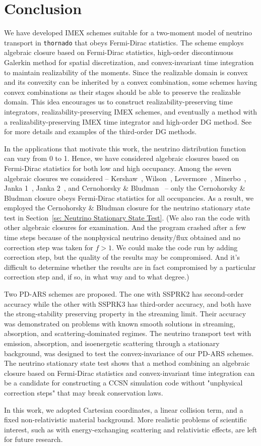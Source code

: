 \section{Conclusion}\label{se:Conclusion}

We have developed IMEX schemes suitable for a two-moment model of neutrino transport in \texttt{thornado} that obeys Fermi-Dirac statistics.
The scheme employs algebraic closure based on Fermi-Dirac statistics, high-order discontinuous Galerkin method for spatial discretization, and convex-invariant time integration to maintain realizability of the moments.  
Since the realizable domain is convex and its convexity can be inherited by a convex combination, some schemes having convex combinations as their stages should be able to preserve the realizable domain.
This idea encourages us to construct realizability-preserving time integrators, realizability-preserving IMEX schemes, and eventually a method with a realizability-preserving IMEX time integrator and high-order DG method.
See~\cite{chu_etal_2018} for more details and examples of the third-order DG methods.  

In the applications that motivate this work, the neutrino distribution function can vary from 0 to 1.  
Hence, we have considered algebraic closures based on Fermi-Dirac statistics for both low and high occupancy.  
Among the seven algebraic closures we considered -- Kershaw~\cite{kershaw_1976}, Wilson~\cite{wilson_1975,leblancWilson_1970}, Levermore~\cite{levermore_1984}, Minerbo~\cite{minerbo_1978}, Janka 1~\cite{janka_1991}, Janka 2~\cite{janka_1992}, and Cernohorsky \& Bludman~\cite{cernohorskyBludman_1994} -- only the Cernohorsky \& Bludman closure obeys Fermi-Dirac statistics for all occupancies.  
As a result, we employed the Cernohorsky \& Bludman closure for the neutrino stationary state test in Section~\ref{se: Neutrino Stationary State Test}.
(We also ran the code with other algebraic closures for examination.
And the program crashed after a few time steps because of the nonphysical neutrino density/flux obtained and no correction step was taken for $f>1$.
We could make the code run by adding correction step, but the quality of the results may be compromised.
And it's difficult to determine whether the results are in fact compromised by a particular correction step and, if so, in what way and to what degree.)

Two PD-ARS schemes are proposed.
The one with SSPRK2 has second-order accuracy while the other with SSPRK3 has third-order accuracy, and both have the strong-stability preserving property in the streaming limit.  
Their accuracy was demonstrated on problems with known smooth solutions in streaming, absorption, and scattering-dominated regimes.
The neutrino transport test with emission, absorption, and isoenergetic scattering through a stationary background, was designed to test the convex-invariance of our PD-ARS schemes. 
The neutrino stationary state test shows that a method combining an algebraic closure based on Fermi-Dirac statistics and convex-invariant time integration can be a candidate for constructing a CCSN simulation code without "unphysical correction steps" that may break conservation laws.

In this work, we adopted Cartesian coordinates, a linear collision term, and a fixed non-relativistic material background.
More realistic problems of scientific interest, such as with energy-exchanging scattering and relativistic effects, are left for future research.
